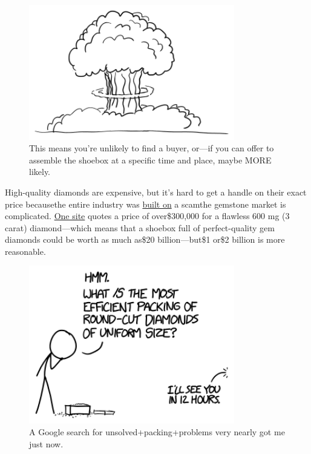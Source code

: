 {\begin{figure}[!htbp]
\centering
\includegraphics[scale=0.5, max width=0.8\textwidth]{imgs/a/108/nuke.png}
\caption{This means you're unlikely to find a buyer, or—if you can offer to assemble the shoebox at a specific time and place, maybe MORE likely.}
\end{figure}

{High-quality diamonds are expensive, but it's hard to get a handle on their exact price becausethe entire industry was \href{https://en.wikipedia.org/wiki/De\_Beers\_Diamonds\_Antitrust\_Litigation}{built on} a scamthe gemstone market is complicated. \href{http://www.info-diamond.com/others/diamond-prices.html}{One site} quotes a price of over\$300,000 for a flawless 600 mg (3 carat) diamond—which means that a shoebox full of perfect-quality gem diamonds could be worth as much as\$20 billion—but\$1 or\$2 billion is more reasonable.}

\begin{figure}[!htbp]
\centering
\includegraphics[scale=0.5, max width=0.8\textwidth]{imgs/a/108/packing.png}
\caption{A Google search for unsolved+packing+problems very nearly got me just now.}
\end{figure}

}
